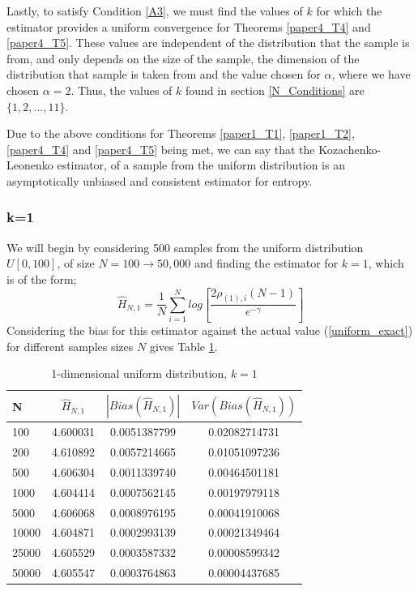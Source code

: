 \documentclass{article}
\begin{document}
Lastly, to satisfy Condition \ref{A3}, we must find the values of $k$ for which the estimator provides a uniform convergence for Theorems \ref{paper4_T4} and \ref{paper4_T5}. These values are independent of the distribution that the sample is from, and only depends on the size of the sample, the dimension of the distribution that sample is taken from and the value chosen for $\alpha$, where we have chosen $\alpha = 2$. Thus, the values of $k$ found in section \ref{N_Conditions} are $\{1, 2, ..., 11\}$.

Due to the above conditions for Theorems \ref{paper1_T1}, \ref{paper1_T2}, \ref{paper4_T4} and \ref{paper4_T5} being met, we can say that the Kozachenko-Leonenko estimator, of a sample from the uniform distribution is an asymptotically unbiased and consistent estimator for entropy. 




\subsubsection{k=1} \label{U_k=1}
We will begin by considering 500 samples from the uniform distribution $U[0,100]$, of size $N=100 \to 50,000$ and finding the estimator for $k=1$, which is of the form;
\begin{equation} 
\hat{H}_{N, 1} = \frac{1}{N} \sum_{i=1}^{N} log \left[ \frac{2\rho_{(1),i} (N-1)}{e^{-\gamma}} \right] \nonumber
\end{equation}
Considering the bias for this estimator against the actual value (\ref{uniform_exact}) for different samples sizes $N$ gives Table \ref{uniform_k=1_table}.

\begin{table}
\caption{1-dimensional uniform distribution, $k=1$} \label{uniform_k=1_table}
\begin{center}
\begin{tabular}{| l | c c c|} 
\toprule
N & $\hat{H}_{N, 1}$ & $|Bias(\hat{H}_{N, 1})|$ & $Var(Bias(\hat{H}_{N, 1}))$ \\
\midrule[1pt]
100     & 4.600031     & 0.0051387799     & 0.02082714731  \\
200     & 4.610892     & 0.0057214665     & 0.01051097236  \\
500     & 4.606304     & 0.0011339740     & 0.00464501181  \\
1000    & 4.604414     & 0.0007562145     & 0.00197979118  \\
5000    & 4.606068     & 0.0008976195     & 0.00041910068  \\
10000   & 4.604871     & 0.0002993139     & 0.00021349464  \\
25000   & 4.605529     & 0.0003587332     & 0.00008599342  \\
50000   & 4.605547     & 0.0003764863     & 0.00004437685  \\
\hline
\end{tabular}
\end{center}
\end{table}
\end{document}

